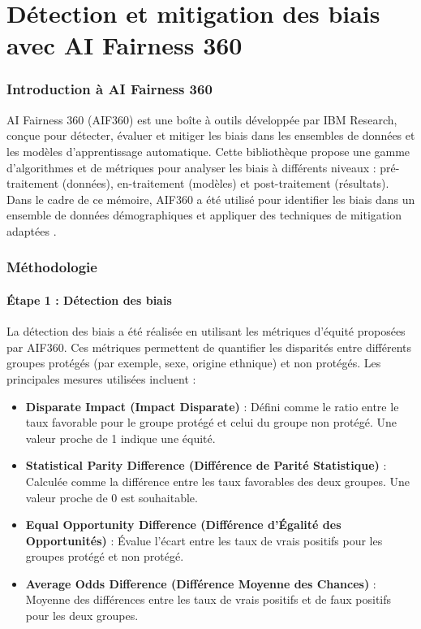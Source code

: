 \documentclass{article}
\begin{document}
\section*{Détection et mitigation des biais avec AI Fairness 360}

\subsubsection{Introduction à AI Fairness 360}

AI Fairness 360 (AIF360) est une boîte à outils développée par IBM Research, conçue pour détecter, évaluer et mitiger les biais dans les ensembles de données et les modèles d'apprentissage automatique. Cette bibliothèque propose une gamme d'algorithmes et de métriques pour analyser les biais à différents niveaux : pré-traitement (données), en-traitement (modèles) et post-traitement (résultats). Dans le cadre de ce mémoire, AIF360 a été utilisé pour identifier les biais dans un ensemble de données démographiques et appliquer des techniques de mitigation adaptées \cite{aif360}.

\subsubsection{Méthodologie}

\paragraph*{Étape 1 : Détection des biais}

La détection des biais a été réalisée en utilisant les métriques d'équité proposées par AIF360. Ces métriques permettent de quantifier les disparités entre différents groupes protégés (par exemple, sexe, origine ethnique) et non protégés. Les principales mesures utilisées incluent :

\begin{itemize}
    \item \textbf{Disparate Impact (Impact Disparate)} : Défini comme le ratio entre le taux favorable pour le groupe protégé et celui du groupe non protégé. Une valeur proche de 1 indique une équité.
    \item \textbf{Statistical Parity Difference (Différence de Parité Statistique)} : Calculée comme la différence entre les taux favorables des deux groupes. Une valeur proche de 0 est souhaitable.
    \item \textbf{Equal Opportunity Difference (Différence d'Égalité des Opportunités)} : Évalue l'écart entre les taux de vrais positifs pour les groupes protégé et non protégé.
    \item \textbf{Average Odds Difference (Différence Moyenne des Chances)} : Moyenne des différences entre les taux de vrais positifs et de faux positifs pour les deux groupes.
\end{itemize}
\end{document}
